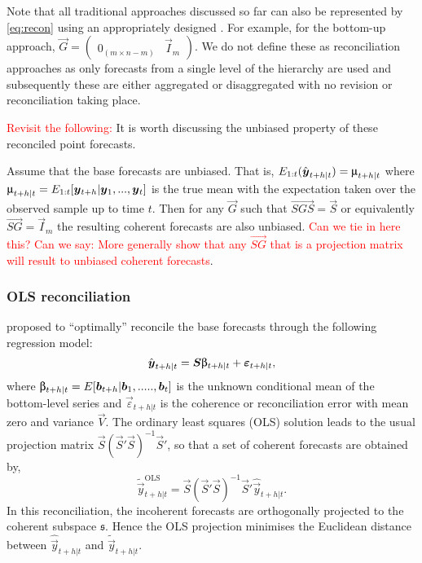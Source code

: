 \documentclass[graybox]{svmult}
\begin{document}
Note that all traditional approaches discussed so far can also be represented by \eqref{eq:recon} using an appropriately designed . For example, for the bottom-up approach, $\vec{G}=\begin{pmatrix}
0_{(m \times n-m)} & \vec{I}_m
\end{pmatrix}$. We do not define these as reconciliation approaches as only forecasts from a single level of the hierarchy are used and subsequently these are either aggregated or disaggregated with no revision or reconciliation taking place.

\textcolor{red}{Revisit the following:}
It is worth discussing the unbiased property of these reconciled point forecasts.

Assume that the base forecasts are unbiased. That is, $E_{1:t}(\hat{\vec{y}}_{t+h|t})=\umu_{t+h|t}$ where $\umu_{t+h|t} = E_{1:t}[\vec{y}_{t+h}|\vec{y}_1,...,\vec{y}_t]$ is the true mean with the expectation taken over the observed sample up to time $t$. Then for any $\vec{G}$ such that $\vec{SGS}=\vec{S}$ or equivalently $\vec{SG}=\vec{I}_m$ the resulting coherent forecasts are also unbiased. \textcolor{red}{Can we tie in here this? Can we say: More generally \citep{Gamakumara2018} show that any $\vec{SG}$ that is a projection matrix will result to unbiased coherent forecasts}.

\subsubsection{OLS reconciliation}

\cite{HynEtAl2011} proposed to ``optimally'' reconcile the base forecasts through the following regression model:
\begin{equation*}
\hat{\vec{y}}_{t+h|t} = \vec{S\ubeta}_{t+h|t} + \vec{\varepsilon}_{t+h|t},
\end{equation*}
where $\vec{\ubeta}_{t+h|t}=E[\vec{b}_{t+h}|\vec{b}_1,.....,\vec{b}_t]$ is the unknown conditional mean of the bottom-level series and $\vec{\varepsilon}_{t+h|t}$ is the coherence or reconciliation error with mean zero and variance $\vec{V}$. The ordinary least squares (OLS) solution leads to the usual projection matrix $\vec{S}(\vec{S}'\vec{S})^{-1}\vec{S}'$, so that a set of coherent forecasts are obtained by,
\begin{equation*}
\tilde{\vec{y}}_{t+h|t}^{\text{OLS}} = \vec{S}(\vec{S}'\vec{S})^{-1}\vec{S}'\hat{\vec{y}}_{t+h|t}.
\end{equation*}
In this reconciliation, the incoherent forecasts are orthogonally projected to the coherent subspace $\mathfrak{s}$. Hence the OLS projection minimises the Euclidean distance between $\hat{\vec{y}}_{t+h|t}$ and $\tilde{\vec{y}}_{t+h|t}$.
\end{document}
